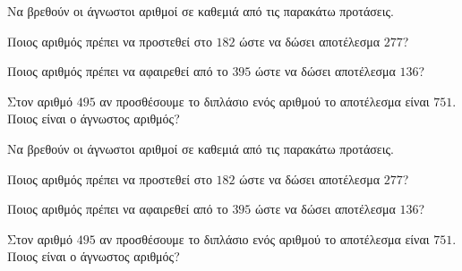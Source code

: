 Να βρεθούν οι άγνωστοι αριθμοί σε καθεμιά από τις παρακάτω προτάσεις.
\begin{rlist}
\item Ποιος αριθμός πρέπει να προστεθεί στο $ 182 $ ώστε να δώσει αποτέλεσμα $ 277 $?
\item Ποιος αριθμός πρέπει να αφαιρεθεί από το $ 395 $ ώστε να δώσει αποτέλεσμα $ 136 $?
\item Στον αριθμό $ 495 $ αν προσθέσουμε το διπλάσιο ενός αριθμού το αποτέλεσμα είναι $ 751 $. Ποιος είναι ο άγνωστος αριθμός?
\end{rlist}
Να βρεθούν οι άγνωστοι αριθμοί σε καθεμιά από τις παρακάτω προτάσεις.
\begin{rlist}
\item Ποιος αριθμός πρέπει να προστεθεί στο $ 182 $ ώστε να δώσει αποτέλεσμα $ 277 $?
\item Ποιος αριθμός πρέπει να αφαιρεθεί από το $ 395 $ ώστε να δώσει αποτέλεσμα $ 136 $?
\item Στον αριθμό $ 495 $ αν προσθέσουμε το διπλάσιο ενός αριθμού το αποτέλεσμα είναι $ 751 $. Ποιος είναι ο άγνωστος αριθμός?
\end{rlist}
